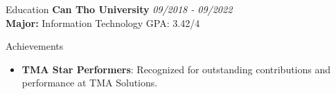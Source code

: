 \documentclass{resume} %
\begin{document}

\begin{rSection}{Education}
{\bf Can Tho University} \hfill {\em 09/2018 - 09/2022} 
\\ \textbf{Major:} Information Technology \hfill { GPA: 3.42/4 }
\end{rSection}


\begin{rSection}{Achievements}
\begin{itemize}
    \item {\bf TMA Star Performers}: Recognized for outstanding contributions and performance at TMA Solutions.
\end{itemize}
\end{rSection}
\end{document}
